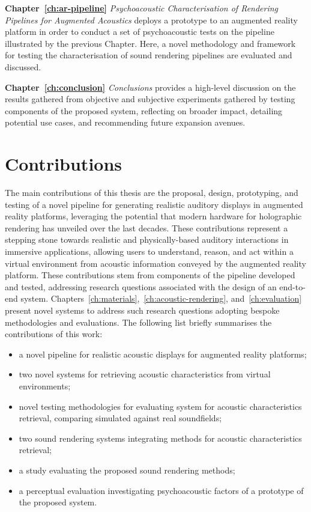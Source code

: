 \textbf{Chapter~\ref{ch:ar-pipeline}} \textit{Psychoacoustic Characterisation of Rendering Pipelines for Augmented Acoustics} deploys a prototype to an augmented reality platform in order to conduct a set of psychoacoustic tests on the pipeline illustrated by the previous Chapter. Here, a novel methodology and framework for testing the characterisation of sound rendering pipelines are evaluated and discussed.

\textbf{Chapter~\ref{ch:conclusion}} \textit{Conclusions} provides a high-level discussion on the results gathered from objective and subjective experiments gathered by testing components of the proposed system, reflecting on broader impact, detailing potential use cases, and recommending future expansion avenues.

\section{Contributions}
The main contributions of this thesis are the proposal, design, prototyping, and testing of a novel pipeline for generating realistic auditory displays in augmented reality platforms, leveraging the potential that modern hardware for holographic rendering has unveiled over the last decades. These contributions represent a stepping stone towards realistic and physically-based auditory interactions in immersive applications, allowing users to understand, reason, and act within a virtual environment from acoustic information conveyed by the augmented reality platform.
These contributions stem from components of the pipeline developed and tested, addressing research questions associated with the design of an end-to-end system. Chapters~\ref{ch:materials},~\ref{ch:acoustic-rendering}, and~\ref{ch:evaluation} present novel systems to address such research questions adopting bespoke methodologies and evaluations. The following list briefly summarises the contributions of this work:
\begin{itemize}
    \item a novel pipeline for realistic acoustic displays for augmented reality platforms;
    \item two novel systems for retrieving acoustic characteristics from virtual environments;
    \item novel testing methodologies for evaluating system for acoustic characteristics retrieval, comparing simulated against real soundfields;
    \item two sound rendering systems integrating methods for acoustic characteristics retrieval;
    \item a study evaluating the proposed sound rendering methods;
    \item a perceptual evaluation investigating psychoacoustic factors of a prototype of the proposed system.
\end{itemize}

